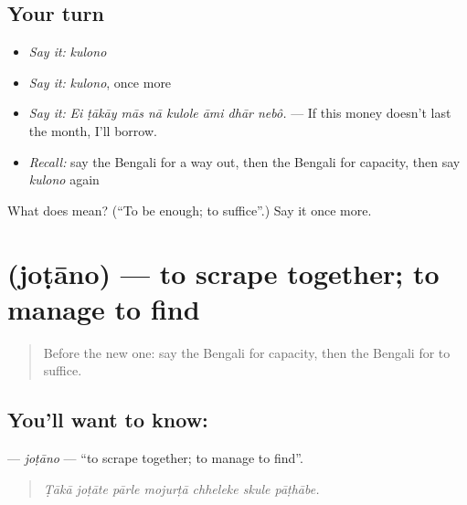 \subsection*{Your turn}
\begin{itemize}
\raggedright
  \item \emph{Say it:} \emph{kulono}
  \item \emph{Say it:} \emph{kulono}, once more
  \item \emph{Say it:} \emph{Ei ṭākāy mās nā kulole āmi dhār nebô.} — If this money doesn't last the month, I'll borrow.
  \item \emph{Recall:} say the Bengali for a way out, then the Bengali for capacity, then say \emph{kulono} again
\end{itemize}

\begin{tcolorbox}[breakable,colback=teal!4,colframe=teal!35!black,title={Before you move on}]
What does  mean? (\textquotedblleft{}To be enough; to suffice\textquotedblright{}.) Say it once more.
\end{tcolorbox}
\section[\texorpdfstring{\bn{জোটানো} (joṭāno)}{জোটানো (joṭāno)}]{ (joṭāno) — to scrape together; to manage to find}

\label{lesson:BN-C528-jotano}



\begin{quote}
Before the new one: say the Bengali for capacity, then the Bengali for to suffice.
\end{quote}

\subsection*{You'll want to know: }
\textbf{} — \emph{joṭāno} — \textquotedblleft{}to scrape together; to manage to find\textquotedblright{}.

\begin{quote}
      
\end{quote}

\begin{quote}
\emph{Ṭākā joṭāte pārle mojurṭā chheleke skule pāṭhābe.}
\end{quote}

